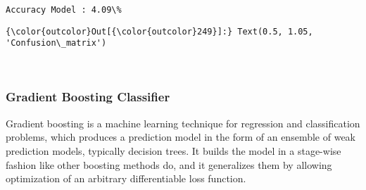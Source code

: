 \documentclass[11pt]{article}
\begin{document}
    \begin{Verbatim}[commandchars=\\\{\}]
Accuracy Model : 4.09\% 

    \end{Verbatim}

\begin{Verbatim}[commandchars=\\\{\}]
{\color{outcolor}Out[{\color{outcolor}249}]:} Text(0.5, 1.05, 'Confusion\_matrix')
\end{Verbatim}
            
    \begin{center}
    \end{center}
    { \hspace*{\fill} \\}
    
    \subsubsection{Gradient Boosting
Classifier}\label{gradient-boosting-classifier}

    Gradient boosting is a machine learning technique for regression and
classification problems, which produces a prediction model in the form
of an ensemble of weak prediction models, typically decision trees. It
builds the model in a stage-wise fashion like other boosting methods do,
and it generalizes them by allowing optimization of an arbitrary
differentiable loss function.
\end{document}

